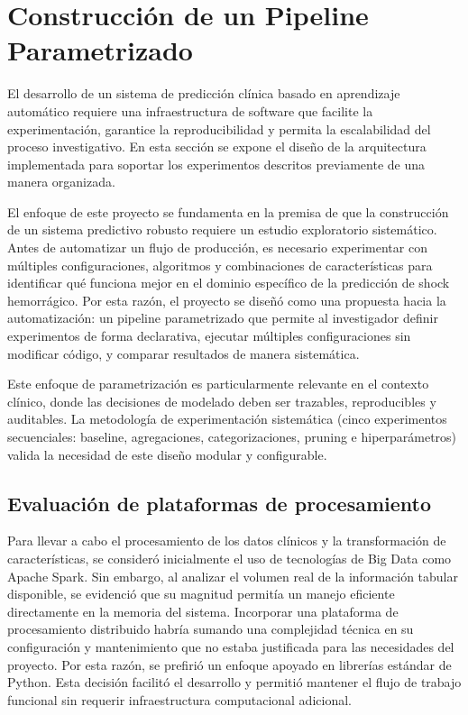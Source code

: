 \section{Construcción de un Pipeline Parametrizado}
\label{sec:arquitectura}

El desarrollo de un sistema de predicción clínica basado en aprendizaje automático requiere una infraestructura de software que facilite la experimentación, garantice la reproducibilidad y permita la escalabilidad del proceso investigativo. En esta sección se expone el diseño de la arquitectura implementada para soportar los experimentos descritos previamente de una manera organizada.

El enfoque de este proyecto se fundamenta en la premisa de que la construcción de un sistema predictivo robusto requiere un estudio exploratorio sistemático. Antes de automatizar un flujo de producción, es necesario experimentar con múltiples configuraciones, algoritmos y combinaciones de características para identificar qué funciona mejor en el dominio específico de la predicción de shock hemorrágico. Por esta razón, el proyecto se diseñó como una propuesta hacia la automatización: un pipeline parametrizado que permite al investigador definir experimentos de forma declarativa, ejecutar múltiples configuraciones sin modificar código, y comparar resultados de manera sistemática.

Este enfoque de parametrización es particularmente relevante en el contexto clínico, donde las decisiones de modelado deben ser trazables, reproducibles y auditables. La metodología de experimentación sistemática (cinco experimentos secuenciales: baseline, agregaciones, categorizaciones, pruning e hiperparámetros) valida la necesidad de este diseño modular y configurable.

\subsection{Evaluación de plataformas de procesamiento}

Para llevar a cabo el procesamiento de los datos clínicos y la transformación de características, se consideró inicialmente el uso de tecnologías de Big Data como Apache Spark. Sin embargo, al analizar el volumen real de la información tabular disponible, se evidenció que su magnitud permitía un manejo eficiente directamente en la memoria del sistema. Incorporar una plataforma de procesamiento distribuido habría sumando una complejidad técnica en su configuración y mantenimiento que no estaba justificada para las necesidades del proyecto. Por esta razón, se prefirió un enfoque apoyado en librerías estándar de Python. Esta decisión facilitó el desarrollo y permitió mantener el flujo de trabajo funcional sin requerir infraestructura computacional adicional.

